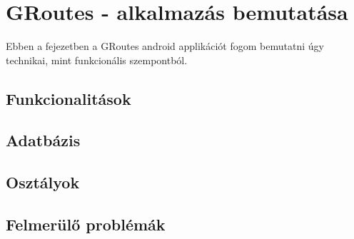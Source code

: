 \chapter{GRoutes - alkalmazás bemutatása}\label{ch:ALAP}

\begin{osszefoglal}
	Ebben a fejezetben a GRoutes android applikációt fogom bemutatni úgy technikai, mint funkcionális szempontból.
	
\end{osszefoglal}

\section{Funkcionalitások}\label{sec:ALAP:adatelem}

\section{Adatbázis}\label{sec:ALAP:adatelem}

\section{Osztályok}\label{sec:ALAP:adatelem}

\section{Felmerülő problémák}\label{sec:ALAP:adatelem}

